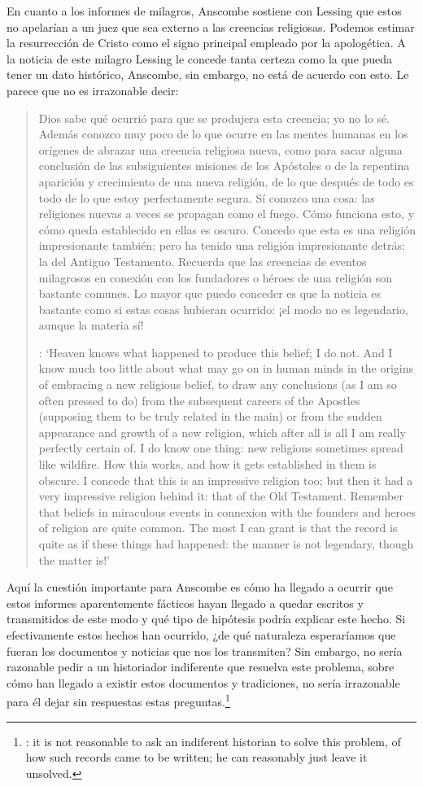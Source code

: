 En cuanto a los informes de milagros, Anscombe sostiene con Lessing que estos no
apelarían a un juez que sea externo a las creencias religiosas. Podemos estimar
la resurrección de Cristo como el signo principal empleado por la apologética. A
la noticia de este milagro Lessing le concede tanta certeza como la que pueda
tener un dato histórico, Anscombe, sin embargo, no está de acuerdo con esto. Le
parece que no es irrazonable decir:
\blockquote[{\cite[26]{anscombe2008faith:prophandmi}}: `Heaven knows what
happened to produce this belief; I do not. And I know much too little about what
may go on in human minds in the origins of embracing a new religious belief, to
draw any conclusions (as I am so often pressed to do) from the subsequent
careers of the Apostles (supposing them to be truly related in the main) or from
the sudden appearance and growth of a new religion, which after all is all I am
really perfectly certain of. I do know one thing: new religions sometimes spread
like wildfire. How this works, and how it gets established in them is obscure. I
concede that this is an impressive religion too; but then it had a very
impressive religion behind it: that of the Old Testament. Remember that beliefs
in miraculous events in connexion with the founders and heroes of religion are
quite common. The most I can grant is that the record is quite as if these
things had happened: the manner is not legendary, though the matter is!']{Dios
  sabe qué ocurrió para que se produjera esta creencia; yo no lo sé. Además
  conozco muy poco de lo que ocurre en las mentes humanas en los orígenes de
  abrazar una creencia religiosa nueva, como para sacar alguna conclusión
  \textelp{} de las subsiguientes misiones de los Apóstoles \textelp{} o de la
  repentina aparición y crecimiento de una nueva religión, de lo que después de
  todo es todo de lo que estoy perfectamente segura. Sí conozco una cosa: las
  religiones nuevas a veces se propagan como el fuego. Cómo funciona esto, y
  cómo queda establecido en ellas es oscuro. Concedo que esta es una religión
  impresionante también; pero ha tenido una religión impresionante detrás: la
  del Antiguo Testamento. Recuerda que las creencias de eventos milagrosos en
  conexión con los fundadores o héroes de una religión son bastante comunes. Lo
  mayor que puedo conceder es que la noticia es bastante como si estas cosas
  hubieran ocurrido: ¡el modo no es legendario, aunque la materia sí!}

Aquí la cuestión importante para Anscombe es cómo ha llegado a ocurrir que estos
informes aparentemente fácticos hayan llegado a quedar escritos y transmitidos
de este modo y qué tipo de hipótesis podría explicar este hecho. Si
efectivamente estos hechos han ocurrido, ¿de qué naturaleza esperaríamos que
fueran los documentos y noticias que nos los transmiten? Sin embargo, no sería
razonable pedir a un historiador indiferente que resuelva este problema, sobre
cómo han llegado a existir estos documentos y tradiciones, no sería irrazonable
para él dejar sin respuestas estas
preguntas.\footnote{\cite[Cf.~][37]{anscombe2008faith:prophandmi}: it is not
  reasonable to ask an indiferent historian to solve this problem, of how such
  records came to be written; he can reasonably just leave it unsolved.}

